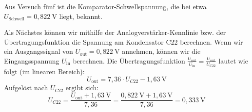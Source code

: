 Aus Versuch fünf ist die Komparator-Schwellspannung, die bei etwa $U_{\text{Schwell}} = 0{,}822~\mathrm{V}$ liegt, bekannt.

Als Nächstes können wir mithilfe der Analogverstärker-Kennlinie bzw. der Übertragungsfunktion die Spannung am Kondensator C22 berechnen.
Wenn wir ein Ausgangssignal von $U_{\text{out}} = 0{,}822~\mathrm{V}$ annehmen, können wir die Eingangsspannung $U_{\text{in}}$ berechnen.
Die Übertragungsfunktion $\frac{U_{\text{out}}}{U_{\text{in}}}=\frac{U_{\text{out}}}{U_{C22}}$ lautet wie folgt (im linearen Bereich):
\begin{equation}
    U_{\text{out}} = 7{,}36 \cdot U_{C22} -1{,}63~\mathrm{V}
\end{equation}
Aufgelöst nach $U_{C22}$ ergibt sich:
\begin{equation}
    U_{C22} = \frac{U_{\text{out}} + 1{,}63~\mathrm{V}}{7{,}36} = \frac{0{,}822~\mathrm{V} + 1{,}63~\mathrm{V}}{7{,}36} = 0{,}333~\mathrm{V}
\end{equation}

